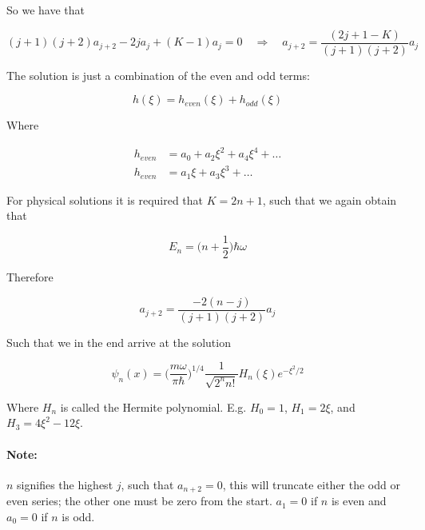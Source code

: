 \documentclass[a4paper]{article}
\begin{document}
So we have that

\begin{equation}
	(j+1)(j+2)a_{j+2}-2ja_j+(K-1)a_j=0\quad\Rightarrow\quad a_{j+2}=\frac{(2j+1-K)}{(j+1)(j+2)}a_j
\end{equation}

The solution is just a combination of the even and odd terms:

\begin{equation}
	h(\xi)=h_{even}(\xi)+h_{odd}(\xi)
\end{equation}

Where 

\begin{align}
	h_{even}&=a_0+a_2\xi^2+a_4\xi^4+\dots\\[0.5em]
	h_{even}&=a_1\xi+a_3\xi^3+\dots
\end{align}

For physical solutions it is required that $K=2n+1$, such that we again obtain that

\begin{equation}
	E_n=\bigg(n+\frac{1}{2}\bigg)\hbar\omega
\end{equation}

Therefore

\begin{equation}
 a_{j+2}=\frac{-2(n-j)}{(j+1)(j+2)}a_j
\end{equation}

Such that we in the end arrive at the solution

\begin{equation}
	\psi_n(x)=\bigg(\frac{m\omega}{\pi\hbar}\bigg)^{1/4}\frac{1}{\sqrt{2^n n!}}H_n(\xi)e^{-\xi^2/2}
\end{equation}

Where $H_n$ is called the Hermite polynomial. E.g. $H_0=1$, $H_1=2\xi$, and $H_3=4\xi^2-12\xi$.

\bigskip

\paragraph{Note:} $n$ signifies the highest $j$, such that $a_{n+2}=0$, this will truncate either the odd or even series; the other one must be zero from the start. $a_1=0$ if $n$ is even and $a_0=0$ if $n$ is odd.
\end{document}
